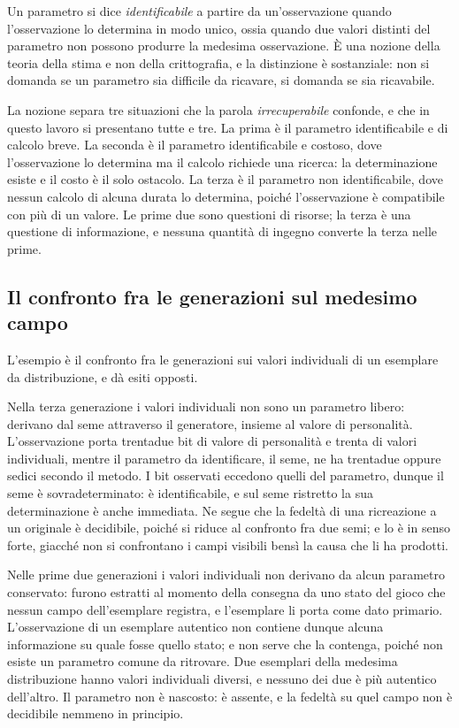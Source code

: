 Un parametro si dice \emph{identificabile} a partire da un'osservazione quando l'osservazione lo determina in modo unico, ossia quando due valori distinti del parametro non possono produrre la medesima osservazione. È una nozione della teoria della stima e non della crittografia, e la distinzione è sostanziale: non si domanda se un parametro sia difficile da ricavare, si domanda se sia ricavabile.

La nozione separa tre situazioni che la parola \emph{irrecuperabile} confonde, e che in questo lavoro si presentano tutte e tre. La prima è il parametro identificabile e di calcolo breve. La seconda è il parametro identificabile e costoso, dove l'osservazione lo determina ma il calcolo richiede una ricerca: la determinazione esiste e il costo è il solo ostacolo. La terza è il parametro non identificabile, dove nessun calcolo di alcuna durata lo determina, poiché l'osservazione è compatibile con più di un valore. Le prime due sono questioni di risorse; la terza è una questione di informazione, e nessuna quantità di ingegno converte la terza nelle prime.

\subsection*{Il confronto fra le generazioni sul medesimo campo}

L'esempio è il confronto fra le generazioni sui valori individuali di un esemplare da distribuzione, e dà esiti opposti.

Nella terza generazione i valori individuali non sono un parametro libero: derivano dal seme attraverso il generatore, insieme al valore di personalità. L'osservazione porta trentadue bit di valore di personalità e trenta di valori individuali, mentre il parametro da identificare, il seme, ne ha trentadue oppure sedici secondo il metodo. I bit osservati eccedono quelli del parametro, dunque il seme è sovradeterminato: è identificabile, e sul seme ristretto la sua determinazione è anche immediata. Ne segue che la fedeltà di una ricreazione a un originale è decidibile, poiché si riduce al confronto fra due semi; e lo è in senso forte, giacché non si confrontano i campi visibili bensì la causa che li ha prodotti.

Nelle prime due generazioni i valori individuali non derivano da alcun parametro conservato: furono estratti al momento della consegna da uno stato del gioco che nessun campo dell'esemplare registra, e l'esemplare li porta come dato primario. L'osservazione di un esemplare autentico non contiene dunque alcuna informazione su quale fosse quello stato; e non serve che la contenga, poiché non esiste un parametro comune da ritrovare. Due esemplari della medesima distribuzione hanno valori individuali diversi, e nessuno dei due è più autentico dell'altro. Il parametro non è nascosto: è assente, e la fedeltà su quel campo non è decidibile nemmeno in principio.

